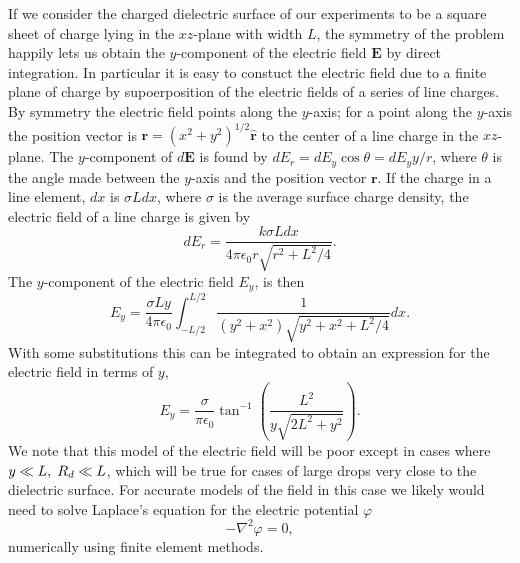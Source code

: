 \documentclass[a4paper, 12pt]{article}
\begin{document}
If we consider the charged dielectric surface of our experiments to be a square sheet of charge lying in the $xz$-plane with width $L$, the symmetry of the problem happily lets us obtain the $y$-component of the electric field $\mathbf{E}$ by direct integration. In particular it is easy to constuct the electric field due to a finite plane of charge by supoerposition of the electric fields of a series of line charges. By symmetry the electric field points along the $y$-axis; for a point along the $y$-axis the position vector is $\mathbf{r} = \left( x^2 + y^2 \right)^{1/2} \hat{\mathbf{r}}$ to the center of a line charge in the $xz$-plane. The $y$-component of $d\mathbf{E}$ is found by $d E_r = d E_y \cos \theta = d E_y y/ r$, where $\theta$ is the angle made between the $y$-axis and the position vector $\mathbf{r}$. If the charge in a line element, $dx$ is $\sigma L dx$, where $\sigma$ is the average surface charge density, the electric field of a line charge is given by \cite{david_j._griffiths_introduction_1999}
\[d E_r = \frac{k \sigma L dx}{4 \pi \epsilon_0 r \sqrt{r^2 + L^2/4}}.
\]
The $y$-component of the electric field $E_y$, is then
\[ E_y = \frac{\sigma L y }{4 \pi \epsilon_0} \int^{L/2}_{-L/2} \frac{1}{(y^2 + x^2) \sqrt{y^2 + x^2 + L^2/4}} dx 
.\]
With some substitutions this can be integrated to obtain an expression for the electric field in terms of $y$, 
\begin{equation}
E_y = \frac{\sigma}{ \pi \epsilon_0} \tan^{-1} \left( \frac{L^2}{y \sqrt{2L^2 + y^2}}\right)
.\end{equation}
We note that this model of the electric field will be poor except in cases where $y \ll L, \hspace{1 mm} R_d \ll L$, which will be true for cases of large drops very close to the dielectric surface. For accurate models of the field in this case we likely would need to solve Laplace's equation for the electric potential $\varphi$
\[ - \nabla^2 \varphi = 0,\]
numerically using finite element methods.
\end{document}
